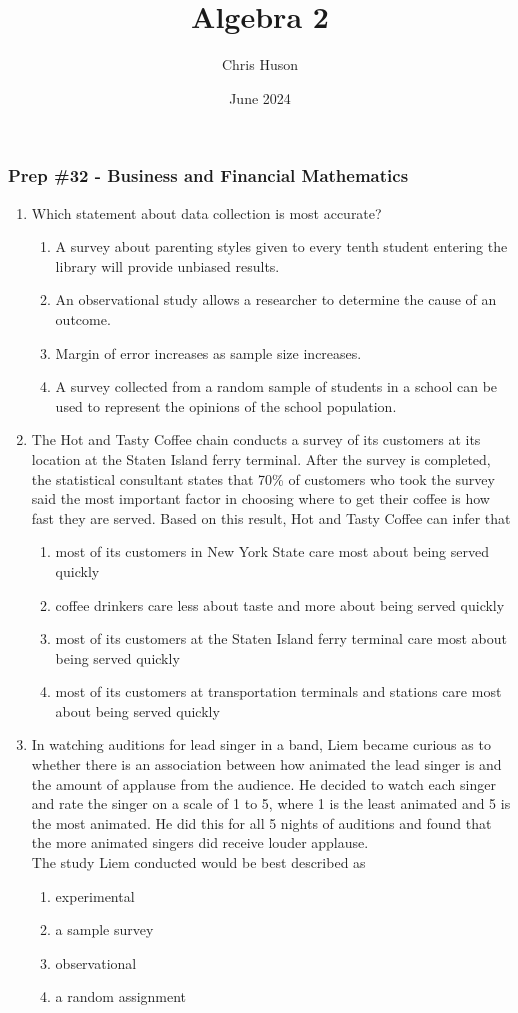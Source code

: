 \documentclass[12pt, twoside]{article}
\title{Algebra 2}
\author{Chris Huson}
\date{June 2024}
\begin{document}
\subsubsection*{Prep \#32 - Business and Financial Mathematics}
\begin{enumerate}
\item Which statement about data collection is most accurate?
\begin{enumerate}
    \item A survey about parenting styles given to every tenth student entering the library will provide unbiased results.
    \item An observational study allows a researcher to determine the cause of an outcome.
    \item Margin of error increases as sample size increases.
    \item A survey collected from a random sample of students in a school can be used to represent the opinions of the school population.
\end{enumerate} %

\item The Hot and Tasty Coffee chain conducts a survey of its customers at its location at the Staten Island ferry terminal. After the survey is completed, the statistical consultant states that 70\% of customers who took the survey said the most important factor in choosing where to get their coffee is how fast they are served. Based on this result, Hot and Tasty Coffee can infer that
\begin{enumerate}
    \item most of its customers in New York State care most about being served quickly
    \item coffee drinkers care less about taste and more about being served quickly
    \item most of its customers at the Staten Island ferry terminal care most about being served quickly
    \item most of its customers at transportation terminals and stations care most about being served quickly
\end{enumerate} %

\item In watching auditions for lead singer in a band, Liem became curious as to whether there is an association between how animated the lead singer is and the amount of applause from the audience. He decided to watch each singer and rate the singer on a scale of 1 to 5, where 1 is the least animated and 5 is the most animated. He did this for all 5 nights of auditions and found that the more animated singers did receive louder applause. \\[0.25cm]
The study Liem conducted would be best described as %
\begin{enumerate}
    \item experimental
    \item a sample survey
    \item observational
    \item a random assignment
\end{enumerate}



\end{enumerate}
\end{document}
